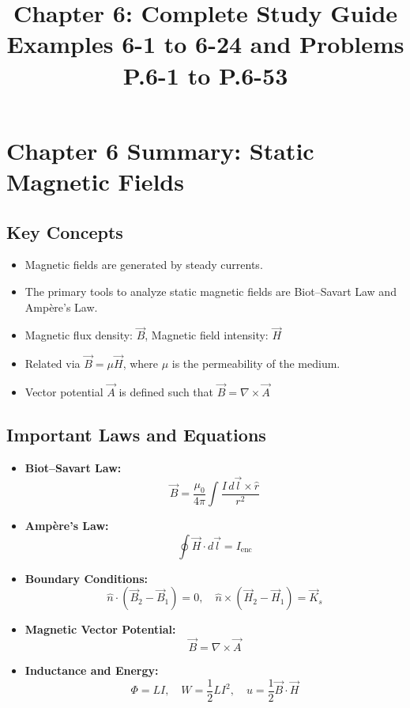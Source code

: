 \documentclass[12pt]{article}
\title{Chapter 6: Complete Study Guide \\ Examples 6-1 to 6-24 and Problems P.6-1 to P.6-53}
\author{}
\date{}
\begin{document}
\maketitle
\tableofcontents
\newpage

\section*{Chapter 6 Summary: Static Magnetic Fields}

\subsection*{Key Concepts}
\begin{itemize}
  \item Magnetic fields are generated by steady currents.
  \item The primary tools to analyze static magnetic fields are Biot–Savart Law and Ampère’s Law.
  \item Magnetic flux density: \( \vec{B} \), Magnetic field intensity: \( \vec{H} \)
  \item Related via \( \vec{B} = \mu \vec{H} \), where \( \mu \) is the permeability of the medium.
  \item Vector potential \( \vec{A} \) is defined such that \( \vec{B} = \nabla \times \vec{A} \)
\end{itemize}

\subsection*{Important Laws and Equations}
\begin{itemize}
  \item \textbf{Biot–Savart Law:}
  \[
  \vec{B} = \frac{\mu_0}{4\pi} \int \frac{I\, d\vec{l} \times \hat{r}}{r^2}
  \]
  
  \item \textbf{Ampère’s Law:}
  \[
  \oint \vec{H} \cdot d\vec{l} = I_{\text{enc}}
  \]

  \item \textbf{Boundary Conditions:}
  \[
  \hat{n} \cdot (\vec{B}_2 - \vec{B}_1) = 0, \quad
  \hat{n} \times (\vec{H}_2 - \vec{H}_1) = \vec{K}_s
  \]

  \item \textbf{Magnetic Vector Potential:}
  \[
  \vec{B} = \nabla \times \vec{A}
  \]

  \item \textbf{Inductance and Energy:}
  \[
  \Phi = L I, \quad W = \frac{1}{2} L I^2, \quad u = \frac{1}{2} \vec{B} \cdot \vec{H}
  \]
\end{itemize}
\end{document}
